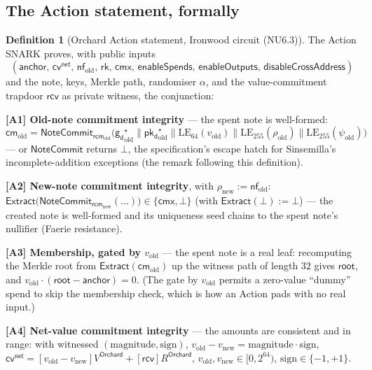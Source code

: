 \documentclass[11pt,a4paper]{article}
\theoremstyle{definition}
\newtheorem{definition}[theorem]{Definition}
\newcommand{\nfsym}{\mathsf{nf}}
\newcommand{\cmsym}{\mathsf{cm}}
\newcommand{\cmx}{\mathsf{cmx}}
\newcommand{\cvsym}{\mathsf{cv}}
\newcommand{\rk}{\mathsf{rk}}
\newcommand{\NoteCommit}{\ensuremath{\mathsf{NoteCommit}}}
\newcommand{\Extract}{\ensuremath{\mathsf{Extract}}}
\newcommand{\pkd}{\ensuremath{\mathsf{pk_d}}}
\newcommand{\gd}{\ensuremath{\mathsf{g_d}}}
\newcommand{\rcv}{\ensuremath{\mathsf{rcv}}}
\newcommand{\rcm}{\ensuremath{\mathsf{rcm}}}
\begin{document}
\subsection{The Action statement, formally}\label{sec:action-stmt}

\begin{definition}[Orchard Action statement, Ironwood circuit (NU6.3)]\label{def:action}
The Action SNARK proves, with public inputs
\[
(\mathsf{anchor},\, \cvsym^{\mathsf{net}},\, \nfsym_{\mathrm{old}},\, \rk,\, \cmx,\, \mathsf{enableSpends},\, \mathsf{enableOutputs},\, \mathsf{disableCrossAddress})
\]
and the note, keys, Merkle path, randomiser $\alpha$, and the
value-commitment trapdoor $\rcv$ as private witness, the conjunction:

\medskip\noindent
\textbf{[A1] Old-note commitment integrity} --- the spent note is
well-formed:
\[
\cmsym_{\mathrm{old}} = \NoteCommit_{\rcm_{\mathrm{old}}}\!\bigl(\gd_{\mathrm{old}}^\star \| \pkd_{\mathrm{old}}^\star \| \mathrm{LE}_{64}(v_{\mathrm{old}}) \| \mathrm{LE}_{255}(\rho_{\mathrm{old}}) \| \mathrm{LE}_{255}(\psi_{\mathrm{old}})\bigr)
\]
--- or $\NoteCommit$ returns $\bot$, the specification's escape hatch for
Sinsemilla's incomplete-addition exceptions (the remark following this
definition).

\noindent
\textbf{[A2] New-note commitment integrity}, with $\rho_{\mathrm{new}} := \nfsym_{\mathrm{old}}$:
$\Extract\bigl(\NoteCommit_{\rcm_{\mathrm{new}}}(\ldots)\bigr) \in \{\cmx, \bot\}$
(with $\Extract(\bot) := \bot$) --- the created note is well-formed
and its uniqueness seed chains to the spent note's nullifier (Faerie resistance).

\noindent
\textbf{[A3] Membership, gated by $v_{\mathrm{old}}$} --- the spent note is
a real leaf: recomputing the Merkle root from $\Extract(\cmsym_{\mathrm{old}})$
up the witness path of length $32$ gives $\mathsf{root}$, and
$v_{\mathrm{old}} \cdot (\mathsf{root} - \mathsf{anchor}) = 0$. (The gate by
$v_{\mathrm{old}}$ permits a zero-value ``dummy'' spend to skip the membership
check, which is how an Action pads with no real input.)

\noindent
\textbf{[A4] Net-value commitment integrity} --- the amounts are consistent
and in range: with witnessed $(\mathrm{magnitude}, \mathrm{sign})$,
$v_{\mathrm{old}} - v_{\mathrm{new}} = \mathrm{magnitude} \cdot \mathrm{sign}$,
$\cvsym^{\mathsf{net}} = [v_{\mathrm{old}} - v_{\mathrm{new}}] V^{\mathsf{Orchard}} + [\rcv] R^{\mathsf{Orchard}}$,
$v_{\mathrm{old}}, v_{\mathrm{new}} \in [0, 2^{64})$, $\mathrm{sign} \in \{-1,+1\}$.


\end{definition}
\end{document}
